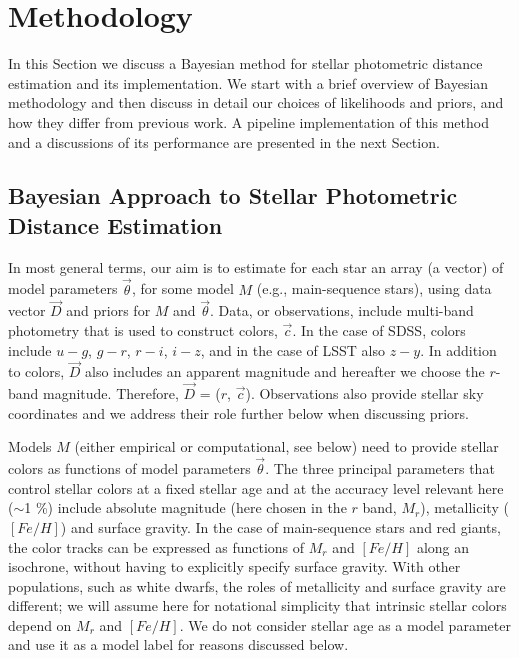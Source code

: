 
\section{Methodology}
\label{sec:method}

In this Section we discuss a Bayesian method for stellar photometric distance estimation and its implementation.
We start with a brief overview of Bayesian methodology and then discuss in detail our choices of likelihoods
and priors, and how they differ from previous work. A pipeline implementation of this method and a discussions
of its performance are presented in the next Section. 


\subsection{Bayesian Approach to Stellar Photometric Distance Estimation}

In most general terms, our aim is to estimate for each star an array (a vector) of model parameters $\vec{\theta}$,
for some model $M$ (e.g., main-sequence stars), using data vector $\vec{D}$ and priors for $M$ and $\vec{\theta}$.
Data, or observations, include multi-band photometry that is used
to construct colors, $\vec{c}$. In the case of SDSS, colors include $u-g$, $g-r$, $r-i$, $i-z$, and in the case of LSST also
$z-y$. In addition to colors, $\vec{D}$ also includes an apparent magnitude and hereafter we choose the $r$-band
magnitude. Therefore, $\vec{D}$ = ($r$, $\vec{c}$). Observations also provide stellar sky coordinates and we
address their role further below when discussing priors.

Models $M$ (either empirical or computational, see below) need to provide stellar colors as functions of model parameters
$\vec{\theta}$. 
The three principal parameters that control stellar colors at a fixed stellar age and at the accuracy level relevant here
($\sim$1 \%) include absolute magnitude (here chosen in the $r$ band, $M_r$), metallicity ($[Fe/H]$) and surface
gravity. In the case of main-sequence stars and red giants, the color tracks can be expressed as functions of $M_r$
and $[Fe/H]$ along an isochrone, without having to explicitly specify surface gravity. With other populations,
such as white dwarfs, the roles of metallicity and surface gravity are different; we will
assume here for notational simplicity that intrinsic stellar colors depend on $M_r$ and $[Fe/H]$. We do not
consider stellar age as a model parameter and use it as a model label for reasons discussed below.  

